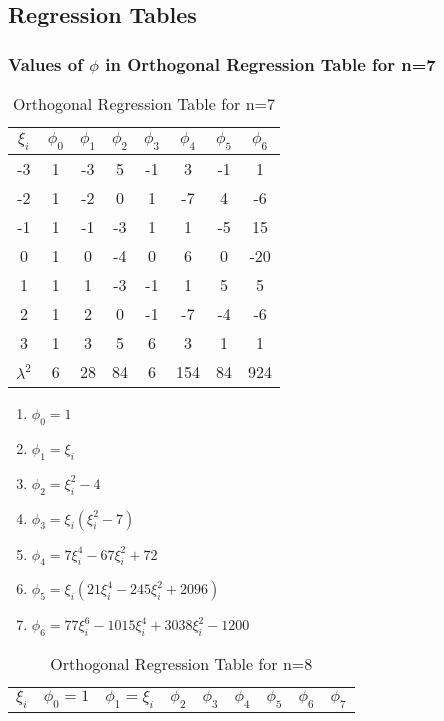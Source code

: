 \documentclass{article}
\begin{document}
\subsection[]{Regression Tables}
\subsubsection{Values of $ \phi $ in Orthogonal Regression Table for n=7}

\begin{table}
 \centering
 \caption{Orthogonal Regression Table for n=7}
 \begin{tabular}{||c||c||c||c||c||c||c||c||}
 \hline
 \hline
$ \xi_i $&$ \phi_0  $&$ \phi_1 $&$ \phi_2  $& $ \phi_3 $ & $ \phi_4  $ & $ \phi_5 $ & $ \phi_6 $ \\
  \hline
  \hline
  -3 & 1 & -3 & 5 & -1 & 3 & -1 & 1 \\
  \hline
  \hline
  -2 & 1 & -2 & 0 & 1 & -7 & 4 & -6 \\
  \hline
  \hline
  -1 & 1 & -1 & -3 & 1 & 1 & -5 & 15 \\
  \hline
  \hline
   0 & 1 & 0 & -4 & 0 & 6 & 0 & -20 \\
  \hline 
  \hline
   1 & 1 & 1 & -3 & -1 & 1 & 5 & 5 \\
   \hline
   \hline
   2 & 1 & 2 & 0 & -1 & -7 & -4 &-6 \\
   \hline
   \hline
   3 & 1 & 3 & 5 & 6 & 3 & 1 & 1 \\
   \hline
   \hline
   $\lambda^2$ & 6 & 28 & 84 & 6 & 154 & 84 & 924 \\
   \hline
   \hline
  
 \end{tabular}
\end{table}

\begin{enumerate}
 \item $ \phi_0 = 1 $
 \item $ \phi_1 = \xi_i $ 
 \item $ \phi_2 = \xi_i^2-4 $
 \item $ \phi_3 = \xi_i(\xi_i^2-7) $ 
 \item $ \phi_4 = 7\xi_i^4-67\xi_i^2+72 $
 \item $ \phi_5 = \xi_i(21\xi_i^4-245\xi_i^2+2096) $
 \item $ \phi_6 = 77\xi_i^6-1015\xi_i^4+3038\xi_i^2-1200 $ 
\end{enumerate}

\begin{table}
 \centering
 \caption{Orthogonal Regression Table for n=8}
 \begin{tabular}{||c||c||c||c||c||c||c||c||c||}
  \hline
  \hline
  $ \xi_i $&$ \phi_0 = 1 $&$ \phi_1 = \xi_i $&$ \phi_2  $& 
                                              $ \phi_3  $&$ \phi_4 $&$ \phi_5$ & 
                                                                    $ \phi_6 $ &  $\phi_7 $\\
 \end{tabular}

\end{table}
\end{document}
